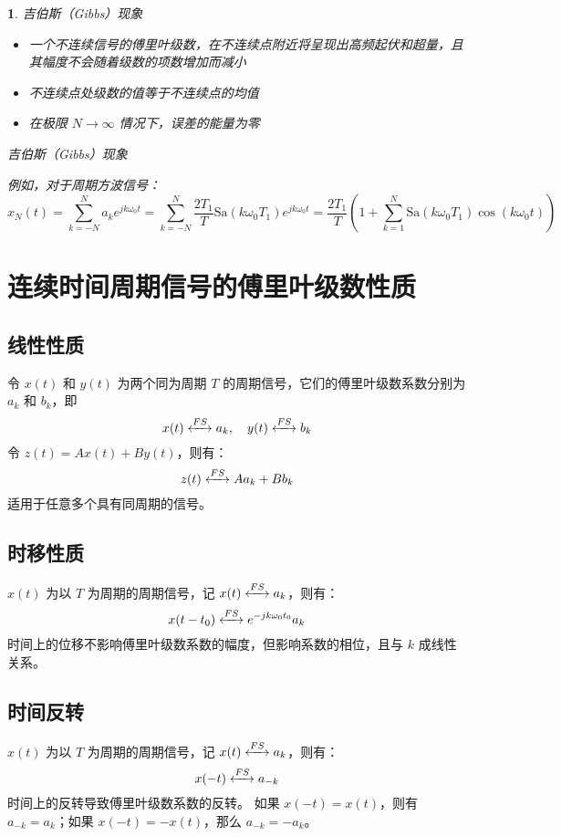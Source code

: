 \documentclass[UTF8]{report}
\theoremstyle{MyLineTheoremStyle} %
\theoremstyle{MyBlockTheoremStyle} %
\theoremstyle{MySubsubsectionStyle} %
\newtheorem{definition}{}
\begin{document}
\begin{definition}
    吉伯斯（Gibbs）现象\par
    \begin{itemize}
    \item 一个不连续信号的傅里叶级数，在不连续点附近将呈现出高频起伏和超量，且其幅度不会随着级数的项数增加而减小
    \item 不连续点处级数的值等于不连续点的均值\par
    \item 在极限 $N \to \infty$ 情况下，误差的能量为零
    \end{itemize}
    \vspace{1em}
    吉伯斯（Gibbs）现象\par
    例如，对于周期方波信号：
    \[
    x_N(t) = \sum_{k=-N}^{N} a_k e^{jk\omega_0 t} = \sum_{k=-N}^{N} \frac{2T_1}{T} \text{Sa}(k\omega_0 T_1) e^{jk\omega_0 t} = \frac{2T_1}{T} \left(1 + \sum_{k=1}^{N} \text{Sa}(k\omega_0 T_1) \cos(k\omega_0 t)\right)
    \]
\end{definition}



\section{连续时间周期信号的傅里叶级数性质}

\subsection{线性性质}
令 $x(t)$ 和 $y(t)$ 为两个同为周期 $T$ 的周期信号，它们的傅里叶级数系数分别为 $a_k$ 和 $b_k$，即
\[
x(t) \xleftrightarrow{FS} a_k, \quad y(t) \xleftrightarrow{FS} b_k
\]
令 $z(t) = A x(t) + B y(t)$，则有：
\[
z(t) \xleftrightarrow{FS} A a_k + B b_k
\]
适用于任意多个具有同周期的信号。

\subsection{时移性质}
$x(t)$ 为以 $T$ 为周期的周期信号，记 $x(t) \xleftrightarrow{FS} a_k$，则有：
\[
x(t - t_0) \xleftrightarrow{FS} e^{-jk\omega_0 t_0} a_k
\]
时间上的位移不影响傅里叶级数系数的幅度，但影响系数的相位，且与 $k$ 成线性关系。

\subsection{时间反转}
$x(t)$ 为以 $T$ 为周期的周期信号，记 $x(t) \xleftrightarrow{FS} a_k$，则有：
\[
x(-t) \xleftrightarrow{FS} a_{-k}
\]
时间上的反转导致傅里叶级数系数的反转。
如果 $x(-t) = x(t)$，则有 $a_{-k} = a_k$；如果 $x(-t) = -x(t)$，那么 $a_{-k} = -a_k$。
\end{document}
